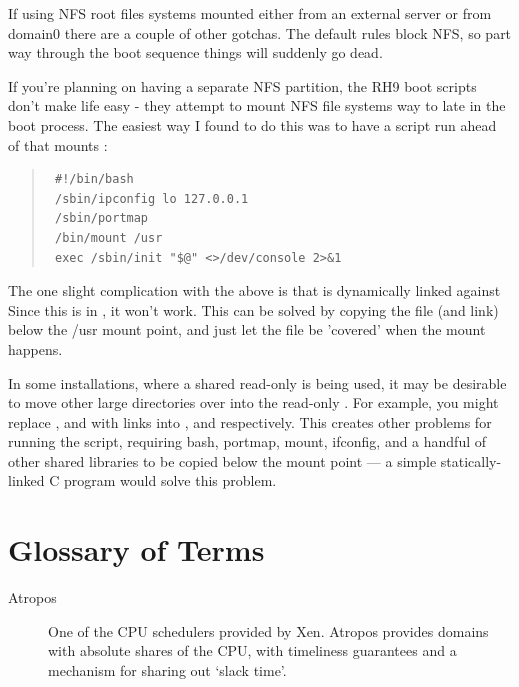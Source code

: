 \documentclass[11pt,twoside,final,openright]{report}
\begin{document}
{If using NFS root files systems mounted either from an
external server or from domain0 there are a couple of other gotchas.
The default {} rules block NFS, so part
way through the boot sequence things will suddenly go dead.

If you're planning on having a separate NFS {} partition, the
RH9 boot scripts don't make life easy - they attempt to mount NFS file
systems way to late in the boot process. The easiest way I found to do
this was to have a {} script run ahead of
{} that mounts {}:

\begin{quote}
\begin{small}\begin{verbatim}
 #!/bin/bash
 /sbin/ipconfig lo 127.0.0.1
 /sbin/portmap
 /bin/mount /usr
 exec /sbin/init "$@" <>/dev/console 2>&1
\end{verbatim}\end{small}
\end{quote}


The one slight complication with the above is that
{} is dynamically linked against
{} Since this is in
{}, it won't work. This can be solved by copying the
file (and link) below the /usr mount point, and just let the file be
'covered' when the mount happens.

In some installations, where a shared read-only {} is
being used, it may be desirable to move other large directories over
into the read-only {}. For example, you might replace
{}, {} and {} with
links into {}, {}
and {} respectively. This creates other
problems for running the {} script, requiring
bash, portmap, mount, ifconfig, and a handful of other shared
libraries to be copied below the mount point --- a simple
statically-linked C program would solve this problem.




\chapter{Glossary of Terms}

\begin{description}
\item[Atropos]             One of the CPU schedulers provided by Xen.
                           Atropos provides domains with absolute shares
                           of the CPU, with timeliness guarantees and a
                           mechanism for sharing out `slack time'.


\end{description}}
\end{document}
